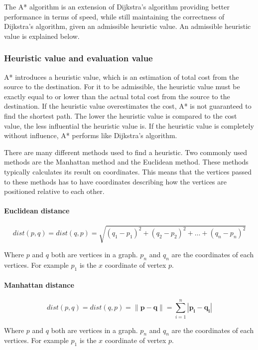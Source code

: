   The A* algorithm is an extension of Dijkstra's algorithm providing better performance in terms of speed, while still maintaining the correctness of Dijkstra's algorithm, given an admissible heuristic value. An admissible heuristic value is explained below.

 
  \subsubsection{Heuristic value and evaluation value}
  A* introduces a heuristic value, which is an estimation of total cost from the source to the destination. For it to be admissible, the heuristic value must be exactly equal to or lower than the actual total cost from the source to the destination. If the heuristic value overestimates the cost, A* is not guaranteed to find the shortest path. The lower the heuristic value is compared to the cost value, the less influential the heuristic value is. If the heuristic value is completely without influence, A* performs like Dijkstra's algorithm.

  There are many different methods used to find a heuristic. Two commonly used methods are the Manhattan method and the Euclidean method. These methods typically calculates its result on coordinates. This means that the vertices passed to these methods has to have coordinates describing how the vertices are positioned relative to each other.

    \paragraph{Euclidean distance}\cite{wiki_euclidean}

  \[
    dist(p, q) = dist(q, p) = \sqrt{(q_{1} - p_{1})^2 + (q_{2} - p_{2})^2 + \dots + (q_{n} - p_{n})^2}
  \]

  Where $p$ and $q$ both are vertices in a graph. $p_{n}$ and $q_{n}$ are the coordinates of each vertices. For example $p_{1}$ is the $x$ coordinate of vertex $p$.

    \paragraph{Manhattan distance}\cite{wiki_manhattan_distance}

  \[
    dist(p, q) = dist(q, p) = \| \mathbf{p} - \mathbf{q} \| = \sum\limits_{i=1}^n | \mathbf{p_{i}} - \mathbf{q_{i}} |
  \]

  Where $p$ and $q$ both are vertices in a graph. $p_{n}$ and $q_{n}$ are the coordinates of each vertices. For example $p_{1}$ is the $x$ coordinate of vertex $p$.



